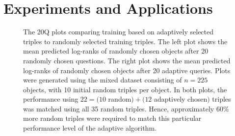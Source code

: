 \documentclass{article}
\begin{document}
\section{Experiments and Applications}


\begin{figure}
 \caption{\label{fig:YAY} The 20Q plots comparing training based on adaptively selected triples to randomly selected training triples.  The left plot shows the mean predicted log-ranks of randomly chosen objects after 20 randomly chosen questions. The right plot shows the mean predicted log-ranks of randomly chosen objects after 20 adaptive queries.
Plots were generated using the mixed dataset consisting of $n=225$ objects, with 10 initial random triples per object.  In both plots, the performance using $22 = (10 $ random$) + (12$ adaptively chosen$)$ triples was matched using all 35 random triples.  Hence, approximately 60\% more random triples were required to match this particular performance level of the adaptive algorithm.
}
\end{figure}
\end{document}
